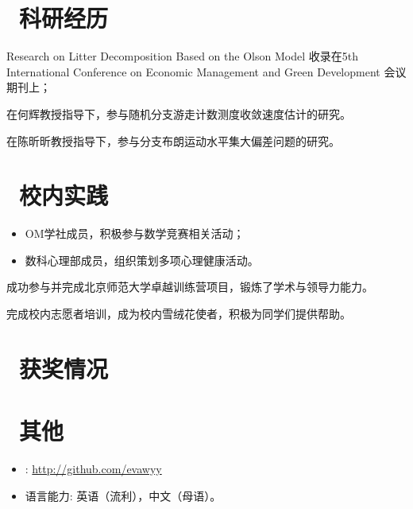 \documentclass{resume}
\begin{document}
\section{\faLightbulbO\ 科研经历}
Research on Litter Decomposition Based on the Olson Model 收录在5th International Conference on Economic Management and Green Development
会议期刊上；

在何辉教授指导下，参与随机分支游走计数测度收敛速度估计的研究。

在陈昕昕教授指导下，参与分支布朗运动水平集大偏差问题的研究。

\section{\faBell\ 校内实践}
\begin{itemize}
  \item OM学社成员，积极参与数学竞赛相关活动；
  \item 数科心理部成员，组织策划多项心理健康活动。
\end{itemize}

成功参与并完成北京师范大学卓越训练营项目，锻炼了学术与领导力能力。

完成校内志愿者培训，成为校内雪绒花使者，积极为同学们提供帮助。

\section{\faHeartO\ 获奖情况}

\section{\faInfo\ 其他}
\begin{itemize}[parsep=0.5ex]
  \item \faGithub: \href{http://github.com/evawyy}{http://github.com/evawyy}
  \item 语言能力: 英语（流利），中文（母语）。
\end{itemize}

%
%
\end{document}
